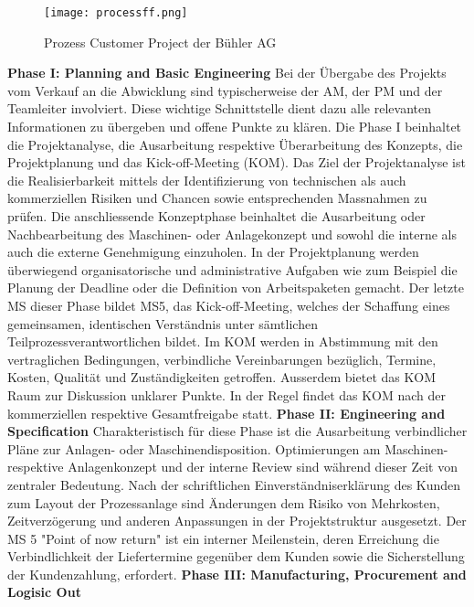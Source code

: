 \begin{figure}[H]
	\centering
	\texttt{[image: processff.png]}
	\caption{Prozess Customer Project der Bühler AG}
	\label{fig: processff}
\end{figure}
\textbf{Phase I: Planning and Basic Engineering}
\newline
Bei der Übergabe des Projekts vom Verkauf an die Abwicklung sind typischerweise der AM, der PM und der Teamleiter involviert. Diese wichtige Schnittstelle dient dazu alle relevanten Informationen zu übergeben und offene Punkte zu klären. Die Phase I beinhaltet die Projektanalyse, die Ausarbeitung respektive Überarbeitung des Konzepts, die Projektplanung und das Kick-off-Meeting (KOM). Das Ziel der Projektanalyse ist die Realisierbarkeit mittels der Identifizierung von technischen als auch kommerziellen Risiken und Chancen sowie entsprechenden Massnahmen zu prüfen. Die anschliessende Konzeptphase beinhaltet die Ausarbeitung oder Nachbearbeitung des Maschinen- oder Anlagekonzept und sowohl die interne als auch die externe Genehmigung einzuholen. In der Projektplanung werden überwiegend organisatorische und administrative Aufgaben wie zum Beispiel die Planung der Deadline oder die Definition von Arbeitspaketen gemacht. Der letzte MS dieser Phase bildet MS5, das Kick-off-Meeting, welches der Schaffung eines gemeinsamen, identischen Verständnis unter sämtlichen Teilprozessverantwortlichen bildet. Im KOM werden in Abstimmung mit den vertraglichen Bedingungen, verbindliche Vereinbarungen bezüglich, Termine, Kosten, Qualität und Zuständigkeiten getroffen. Ausserdem bietet das KOM Raum zur Diskussion unklarer Punkte. In der Regel findet das KOM nach der kommerziellen respektive Gesamtfreigabe statt.
\newline
\textbf{Phase II: Engineering and Specification}
\newline
Charakteristisch für diese Phase ist die Ausarbeitung verbindlicher Pläne zur Anlagen- oder Maschinendisposition. Optimierungen am Maschinen- respektive Anlagenkonzept und der interne Review sind während dieser Zeit von zentraler Bedeutung. Nach der schriftlichen Einverständniserklärung des Kunden zum Layout der Prozessanlage sind Änderungen dem Risiko von Mehrkosten, Zeitverzögerung und anderen Anpassungen in der Projektstruktur ausgesetzt. Der MS 5 "Point of now return" ist ein interner Meilenstein, deren Erreichung die Verbindlichkeit der Liefertermine gegenüber dem Kunden sowie die Sicherstellung der Kundenzahlung, erfordert. 
\newline
\textbf{Phase III: Manufacturing, Procurement and Logisic Out}
